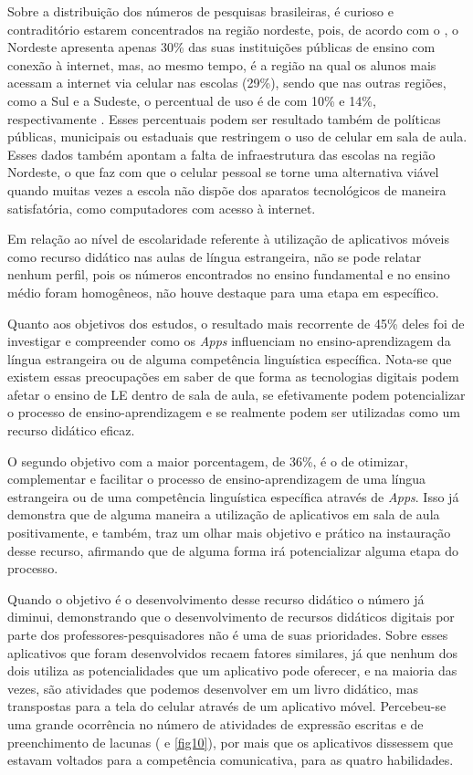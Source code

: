 \documentclass{textolivre}
\begin{document}
Sobre a distribuição dos números de pesquisas brasileiras, é curioso e contraditório estarem concentrados na região nordeste, pois, de acordo com o \textcite{cetic2017}, o Nordeste apresenta apenas 30\% das suas instituições públicas de ensino com conexão à internet, mas, ao mesmo tempo, é a região na qual os alunos mais acessam a internet via celular nas escolas (29\%), sendo que nas outras regiões, como a Sul e a Sudeste, o percentual de uso é de com 10\% e 14\%, respectivamente \cite{cetic2017}. Esses percentuais podem ser resultado também de políticas públicas, municipais ou estaduais que restringem o uso de celular em sala de aula. Esses dados também apontam a falta de infraestrutura das escolas na região Nordeste, o que faz com que o celular pessoal se torne uma alternativa viável quando muitas vezes a escola não dispõe dos aparatos tecnológicos de maneira satisfatória, como computadores com acesso à internet.

Em relação ao nível de escolaridade referente à utilização de aplicativos móveis como recurso didático nas aulas de língua estrangeira, não se pode relatar nenhum perfil, pois os números encontrados no ensino fundamental e no ensino médio foram homogêneos, não houve destaque para uma etapa em específico. 

Quanto aos objetivos dos estudos, o resultado mais recorrente de 45\% deles foi de investigar e compreender como os \textit{Apps} influenciam no ensino-aprendizagem da língua estrangeira ou de alguma competência linguística específica. Nota-se que existem essas preocupações em saber de que forma as tecnologias digitais podem afetar o ensino de LE dentro de sala de aula, se efetivamente podem potencializar o processo de ensino-aprendizagem e se realmente podem ser utilizadas como um recurso didático eficaz. 

O segundo objetivo com a maior porcentagem, de 36\%, é o de otimizar, complementar e facilitar o processo de ensino-aprendizagem de uma língua estrangeira ou de uma competência linguística específica através de \textit{Apps}. Isso já demonstra que de alguma maneira a utilização de aplicativos em sala de aula positivamente, e também, traz um olhar mais objetivo e prático na instauração desse recurso, afirmando que de alguma forma irá potencializar alguma etapa do processo. 

Quando o objetivo é o desenvolvimento desse recurso didático o número já diminui, demonstrando que o desenvolvimento de recursos didáticos digitais por parte dos professores-pesquisadores não é uma de suas prioridades. Sobre esses aplicativos que foram desenvolvidos recaem fatores similares, já que nenhum dos dois utiliza as potencialidades que um aplicativo pode oferecer, e na maioria das vezes, são atividades que podemos desenvolver em um livro didático, mas transpostas para a tela do celular através de um aplicativo móvel. Percebeu-se uma grande ocorrência no número de atividades de expressão escritas e de preenchimento de lacunas ( e \ref{fig10}), por mais que os aplicativos dissessem que estavam voltados para a competência comunicativa, para as quatro habilidades. 
\end{document}
